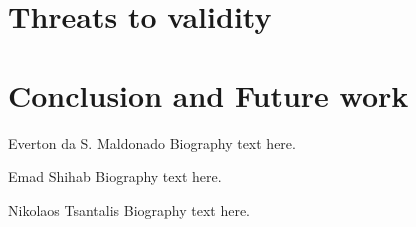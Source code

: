 \documentclass[10pt,journal,compsoc]{IEEEtran}
\begin{document}
\section{Threats to validity}
\label{sec:threats_to_validity}


\section{Conclusion and Future work}
\label{sec:conclusion}




%




\ifCLASSOPTIONcaptionsoff
  \newpage
\fi



 

% 

\begin{IEEEbiography}{Everton da S. Maldonado}
Biography text here.
\end{IEEEbiography}

\begin{IEEEbiography}{Emad Shihab}
Biography text here.
\end{IEEEbiography}

\begin{IEEEbiography}{Nikolaos Tsantalis}
Biography text here.
\end{IEEEbiography}

\clearpage





\end{document}
